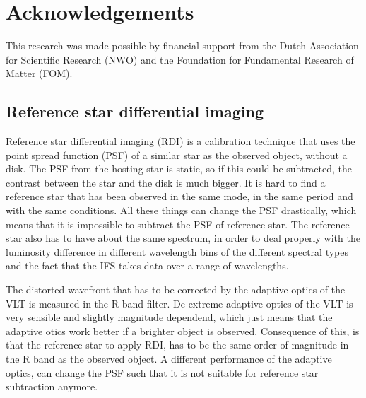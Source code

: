 \documentclass[twoside,single]{lion-msc}
\begin{document}
%

\section*{Acknowledgements}
This research was made possible by financial support from the Dutch Association for Scientific Research (NWO) and the Foundation for Fundamental Research of Matter (FOM).




\clearpage
\subsection*{Reference star differential imaging}
Reference star differential imaging (RDI) is a calibration technique that uses the point spread function (PSF) of a similar star as the observed object, without a disk. The PSF from the hosting star is static, so if this could be subtracted, the contrast between the star and the disk is much bigger. It is hard to find a reference star that has been observed in the same mode, in the same period and with the same conditions. All these things can change the PSF drastically, which means that it is impossible to subtract the PSF of reference star. The reference star also has to have about the same spectrum, in order to deal properly with the luminosity difference in different wavelength bins of the different spectral types and the fact that the IFS takes data over a range of wavelengths. 
\bigskip

The distorted wavefront that has to be corrected by the adaptive optics of the VLT is measured in the R-band filter. De extreme adaptive optics of the VLT is very sensible and slightly magnitude dependend, which just means that the adaptive otics work better if a brighter object is observed. Consequence of this, is that the reference star to apply RDI, has to be the same order of magnitude in the R band as the observed object. A different performance of the adaptive optics, can change the PSF such that it is not suitable for reference star subtraction anymore. 
\end{document}
